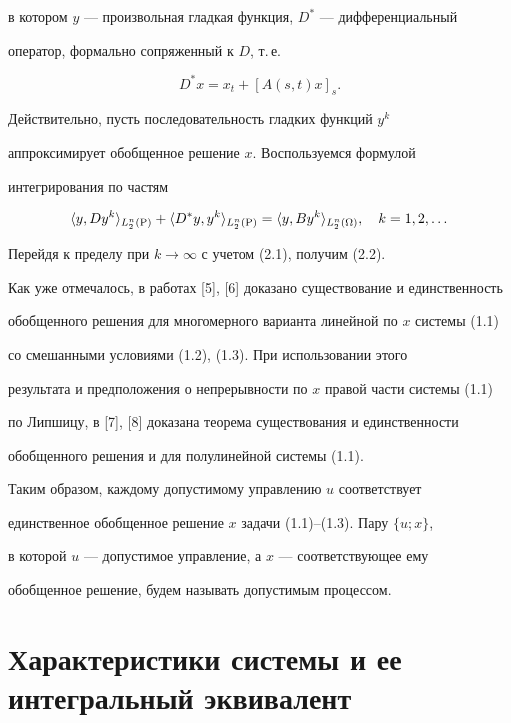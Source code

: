 в котором $y$ --- произвольная гладкая функция, $D^{*}$ --- дифференциальный


оператор, формально сопряженный к $D$, т.\,е.


$$


D^{*} x = x_t + [ A(s,t)x ]_{s}.


$$


Действительно, пусть последовательность гладких функций $y^{k}$


аппроксимирует обобщенное решение $x$. Воспользуемся формулой


интегрирования по частям


$$


\la y,Dy^k \ra_{L_2^n(\P)} + 


\la D^{*}y,y^k \ra_{L_2^n(\P)} = 


\la y,By^k \ra_{L_2^n({\Omega})},\quad k = 1,2,\dotsc


$$


Перейдя к пределу при $k \rightarrow \infty$ с учетом (2.1), получим (2.2).





Как уже отмечалось, в работах [5], [6] доказано существование и единственность


обобщенного решения для многомерного варианта линейной по $x$ системы (1.1)


со смешанными условиями (1.2), (1.3). При использовании этого


результата и предположения о непрерывности по $x$ правой части системы (1.1)


по Липшицу, в [7], [8] доказана теорема существования и единственности


обобщенного решения и для полулинейной системы (1.1).





Таким образом, каждому допустимому управлению $u$ соответствует


единственное обобщенное решение $x$ задачи (1.1)--(1.3). Пару $\{u;x\}$,


в которой $u$ --- допустимое управление, а $x$ --- соответствующее ему


обобщенное решение, будем называть допустимым процессом.





\section{Характеристики системы  и ее интегральный эквивалент}






